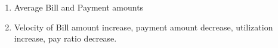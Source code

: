\documentclass[]{article}
\newenvironment{Shaded}{\begin{snugshade}}{\end{snugshade}}
\newcommand{\CommentTok}[1]{\textcolor[rgb]{0.56,0.35,0.01}{\textit{#1}}}
\newcommand{\KeywordTok}[1]{\textcolor[rgb]{0.13,0.29,0.53}{\textbf{#1}}}
\newcommand{\NormalTok}[1]{#1}
\newcommand{\OperatorTok}[1]{\textcolor[rgb]{0.81,0.36,0.00}{\textbf{#1}}}
\newcommand{\StringTok}[1]{\textcolor[rgb]{0.31,0.60,0.02}{#1}}
\begin{document}
\begin{Shaded}
\end{Shaded}

\begin{enumerate}
\def\labelenumi{\arabic{enumi}.}
\setcounter{enumi}{2}
\item
  Average Bill and Payment amounts
\item
  Velocity of Bill amount increase, payment amount decrease, utilization
  increase, pay ratio decrease.
\end{enumerate}
\end{document}
